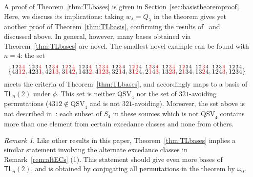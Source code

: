 \documentclass[submission]{FPSAC2024}
\theoremstyle{definition}
\theoremstyle{remark}
\newtheorem{rem}[equation]{Remark}
\numberwithin{equation}{section}
\newcommand{\TL}{\mathsf{TL}}
\newcommand{\QSV}{\mathrm{QSV}}
\begin{document}
A proof of Theorem~\ref{thm:TLbases} is given in Section~\ref{sec:basistheoremproof}.  Here, we discuss its implications: taking $w_{\lambda} = Q_{\lambda}$ in the theorem gives yet another proof of Theorem~\ref{thm:TLbasis}, confirming the results of~\cite{GW16} and~\cite{Z02} discussed above.  In general, however, many bases obtained via Theorem~\ref{thm:TLbases} are novel.  The smallest novel example can be found with $n = 4$: the set 
\[
\{
\stackrel{1}{4} \stackrel{2}{3} \color{red} \stackrel{3}{1} \stackrel{4}{2} \color{black}, 
\stackrel{1}{4} \stackrel{2}{2} \stackrel{3}{3}  \color{red} \stackrel{4}{1} \color{black}, 
\stackrel{1}{4} \stackrel{2}{2}\color{red}  \stackrel{3}{1} \stackrel{4}{3} \color{black}, 
\stackrel{1}{3} \color{red}  \stackrel{2}{1} \color{black} \stackrel{3}{4} \color{red} \stackrel{4}{2}\color{black} , 
\stackrel{1}{1} \stackrel{2}{4} \stackrel{3}{3} \color{red} \stackrel{4}{2} \color{black}, 
\stackrel{1}{4} \color{red} \stackrel{2}{1} \stackrel{3}{2} \stackrel{4}{3} \color{black}, 
\stackrel{1}{3} \stackrel{2}{2} \color{red} \stackrel{3}{1} \color{black} \stackrel{4}{4}, 
\stackrel{1}{3} \color{red} \stackrel{2}{1} \stackrel{3}{2} \color{black} \stackrel{4}{4}, 
\stackrel{1}{2} \color{red} \stackrel{2}{1} \color{black} \stackrel{3}{4} \color{red} \stackrel{4}{3} \color{black}, 
\stackrel{1}{1} \stackrel{2}{3} \color{red} \stackrel{3}{2} \stackrel{4}{3} \color{black}, 
\stackrel{1}{2}  \color{red} \stackrel{2}{1} \color{black} \stackrel{3}{3} \stackrel{4}{4}, 
\stackrel{1}{1} \stackrel{2}{3} \color{red} \stackrel{3}{2} \color{black} \stackrel{4}{4}, 
\stackrel{1}{1} \stackrel{2}{2} \stackrel{3}{4}  \color{red} \stackrel{4}{3} \color{black},
\stackrel{1}{1} \stackrel{2}{2} \stackrel{3}{3} \stackrel{4}{4}
\}
\]
meets the criteria of Theorem~\ref{thm:TLbases}, and accordingly maps to a basis of $\TL_{n}(2)$ under $\phi$. 
This set is neither $\QSV_{4}$ nor the set of $321$-avoiding permutations ($4312 \notin \QSV_{4}$ and is not $321$-avoiding).
Moreover, the set above is not described in~\cite{GW16, Z02}: each subset of $S_{4}$ in these sources which is not $\QSV_{4}$ contains more than one element from certain excedance classes and none from others.  
 
\begin{rem}
Like other results in this paper, Theorem~\ref{thm:TLbases} implies a similar statement involving the alternate excedance classes in Remark~\ref{rem:altECs} (1).  This statement should give even more bases of $\TL_{n}(2)$, and is obtained by conjugating all permutations in the theorem by $\omega_0$.
\end{rem}
\end{document}
